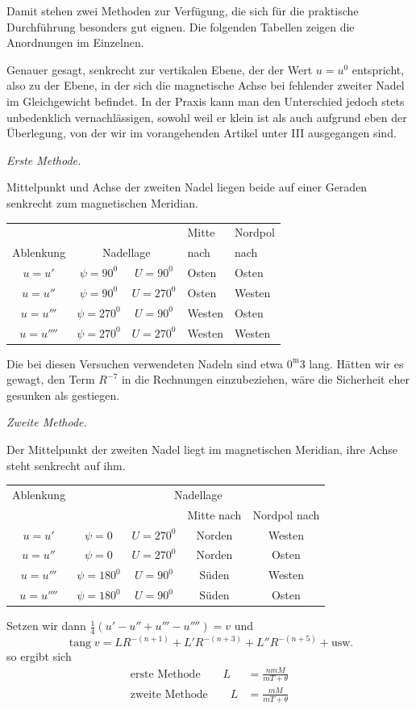 Damit stehen zwei Methoden zur Verfügung, die sich für die praktische Durchführung besonders gut eignen. Die folgenden Tabellen zeigen die Anordnungen im Einzelnen.

\expandafter\def\csname HistoricalNoteText11\endcsname{Genauer gesagt, senkrecht zur vertikalen Ebene, der der Wert $u=u^0$ entspricht, also zu der Ebene, in der sich die magnetische Achse bei fehlender zweiter Nadel im Gleichgewicht befindet. In der Praxis kann man den Unterschied jedoch stets unbedenklich vernachlässigen, sowohl weil er klein ist als auch aufgrund eben der Überlegung, von der wir im vorangehenden Artikel unter III ausgegangen sind.}
\begin{center}
\textit{Erste Methode.}

Mittelpunkt und Achse der zweiten Nadel liegen beide auf einer Geraden senkrecht zum magnetischen Meridian.

\begin{tabular}{c|c|c|l|l}
& & &Mitte&Nordpol\\
Ablenkung&\multicolumn{2}{c|}{Nadellage}&nach&nach\\\hline
$u=u'$&$\psi=90^0$&$U=90^0$&Osten&Osten\\
$u=u''$&$\psi=90^0$&$U=270^0$&Osten&Westen\\
$u=u'''$&$\psi=270^0$&$U=90^0$&Westen&Osten\\
$u=u''''$&$\psi=270^0$&$U=270^0$&Westen&Westen
\end{tabular}
\end{center}
\expandafter\def\csname HistoricalNoteText12\endcsname{Die bei diesen Versuchen verwendeten Nadeln sind etwa $0^{\mathrm m}3$ lang. Hätten wir es gewagt, den Term $R^{-7}$ in die Rechnungen einzubeziehen, wäre die Sicherheit eher gesunken als gestiegen.}
\begin{center}
\textit{Zweite Methode.}\par
Der Mittelpunkt der zweiten Nadel liegt im magnetischen Meridian, ihre Achse steht senkrecht auf ihm.
\begin{tabular}{c|cc|cc}
Ablenkung&\multicolumn{4}{c}{Nadellage}\\
&&&Mitte nach&Nordpol nach\\\hline
$u=u'$&$\psi=0$&$U=270^0$&Norden&Westen\\
$u=u''$&$\psi=0$&$U=270^0$&Norden&Osten\\
$u=u'''$&$\psi=180^0$&$U=90^0$&Süden&Westen\\
$u=u''''$&$\psi=180^0$&$U=90^0$&Süden&Osten
\end{tabular}
\end{center}

Setzen wir dann $\frac14(u'-u''+u'''-u'''')=v$ und
\[
\operatorname{tang}v=LR^{-(n+1)}+L'R^{-(n+3)}+L''R^{-(n+5)}+\text{usw.}
\]
so ergibt sich
\[
\begin{aligned}
\text{erste Methode}\qquad L&=\frac{nmM}{mT+\theta}\\
\text{zweite Methode}\qquad L&=\frac{mM}{mT+\theta}
\end{aligned}
\]
